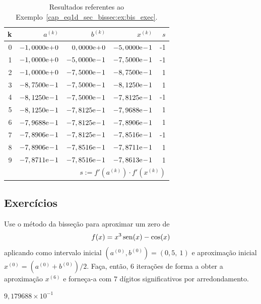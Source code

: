 \begin{ex}
\begin{table}[H]
  \centering
  \caption{Resultados referentes ao Exemplo~\ref{cap_eq1d_sec_bissec:ex:bis_exec}.}
  \begin{tabular}{r|rr|r|r}
    k & $a^{(k)}$ & $b^{(k)}$ & $x^{(k)}$ & $s$\\\hline
    0 & $-1,0000\mathrm{e}\!+\!0$ & $0,0000\mathrm{e}\!+\!0$ & $-5,0000\mathrm{e}\!-\!1$ & -1 \\
    1 & $-1,0000\mathrm{e}\!+\!0$ & $-5,0000\mathrm{e}\!-\!1$ & $-7,5000\mathrm{e}\!-\!1$ & -1 \\
    2 & $-1,0000\mathrm{e}\!+\!0$ & $-7,5000\mathrm{e}\!-\!1$ & $-8,7500\mathrm{e}\!-\!1$ & 1 \\
    3 & $-8,7500\mathrm{e}\!-\!1$ & $-7,5000\mathrm{e}\!-\!1$ & $-8,1250\mathrm{e}\!-\!1$ &  1 \\
    4 & $-8,1250\mathrm{e}\!-\!1$ & $-7,5000\mathrm{e}\!-\!1$ & $-7,8125\mathrm{e}\!-\!1$ & -1 \\
    5 & $-8,1250\mathrm{e}\!-\!1$ & $-7,8125\mathrm{e}\!-\!1$ & $-7,9688\mathrm{e}\!-\!1$ & 1 \\
    6 & $-7,9688\mathrm{e}\!-\!1$ & $-7,8125\mathrm{e}\!-\!1$ & $-7,8906\mathrm{e}\!-\!1$ & 1 \\
    7 & $-7,8906\mathrm{e}\!-\!1$ & $-7,8125\mathrm{e}\!-\!1$ & $-7,8516\mathrm{e}\!-\!1$ & -1 \\
    8 & $-7,8906\mathrm{e}\!-\!1$ & $-7,8516\mathrm{e}\!-\!1$ & $-7,8711\mathrm{e}\!-\!1$ & 1 \\
    9 & $-7,8711\mathrm{e}\!-\!1$ & $-7,8516\mathrm{e}\!-\!1$ & $-7,8613\mathrm{e}\!-\!1$ & 1 \\\hline
    \multicolumn{5}{r}{\small $s := f'(a^{(k)})\cdot f'(x^{(k)})$}
  \end{tabular}
  \label{cap_eq1d_sec_bissec:tab:bis_multpar}
\end{table}
\end{ex}

\subsection{Exercícios}

\begin{exer}
  Use o método da bisseção para aproximar um zero de
  \begin{equation}
    f(x)=x^3\operatorname{sen}(x)-\cos(x)
\end{equation}
aplicando como intervalo inicial $(a^{(0)}, b^{(0)}) = (0,5, ~1)$ e aproximação inicial $x^{(0)}=(a^{(0)}+b^{(0)})/2$. Faça, então, $6$ iterações de forma a obter a aproximação $x^{(6)}$ e forneça-a com $7$ dígitos significativos por arredondamento.
\end{exer}
\begin{resp}
  $9,179688\times 10^{-1}$
\end{resp}

